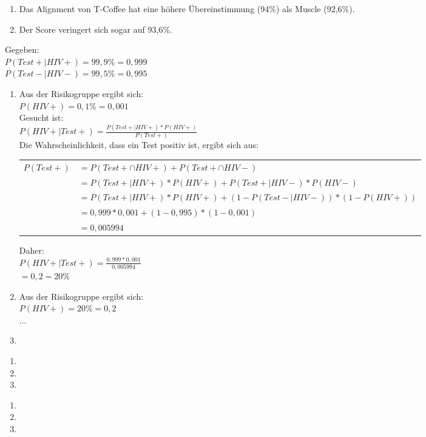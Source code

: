 \documentclass{homework}
\begin{document}
\begin{enumerate}
\begin{enumerate}
\item
Das Alignment von T-Coffee hat eine höhere Übereinstimmung (94\%) als Muscle (92,6\%).

\item
Der Score veringert sich sogar auf 93,6\%.
\end{enumerate}



Gegeben:\\
$P(Test+ | HIV+) = 99,9$\%$ = 0,999$\\
$P(Test- | HIV-) = 99,5$\%$ = 0,995$\\
\begin{enumerate}
\item 
Aus der Risikogruppe ergibt sich:\\
$P(HIV+) = 0,1$\%$ = 0,001$\\
Gesucht ist:\\
$P(HIV+ | Test+) = \frac{P(Test+ | HIV+) * P(HIV+)}{P(Test+)}$\\
Die Wahrscheinlichkeit, dass ein Test positiv ist, ergibt sich aus:\\
\begin{tabular}{l l}
$P(Test+)$ & $= P(Test+ \cap HIV+) + P(Test+ \cap HIV-)$ \\ 
 & $= P(Test+ | HIV+) * P(HIV+) + P(Test+ | HIV-) * P(HIV-)$ \\ 
 & $= P(Test+ | HIV+) * P(HIV+) + (1-P(Test- | HIV-)) * (1-P(HIV+))$\\
 & $= 0,999 * 0,001 + (1-0,995)*(1-0,001)$\\
 & $= 0,005994$\\
\end{tabular} 
Daher: \\
	$P(HIV+ | Test+) = \frac{0,999*0,001}{0,005994}$\\
	$ = 0,2 = 20$\% 
\item
Aus der Risikogruppe ergibt sich:\\
$P(HIV+) = 20$\%$ = 0,2$\\
...
\item
	
\end{enumerate}


\begin{enumerate}
\item 

\item 

\item 

\end{enumerate}


\begin{enumerate}
\item
	
\item

\item

\end{enumerate}

\end{enumerate}
\end{document}
